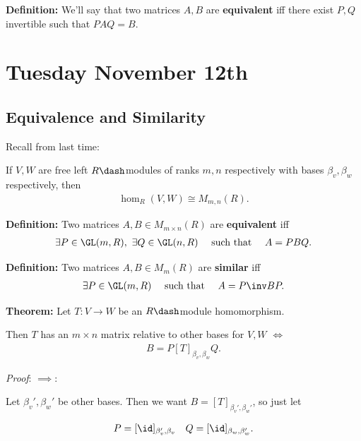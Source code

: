 \textbf{Definition:} We'll say that two matrices \(A, B\) are
\textbf{equivalent} iff there exist \(P, Q\) invertible such that
\(PAQ = B\).

\hypertarget{tuesday-november-12th}{%
\section{Tuesday November 12th}\label{tuesday-november-12th}}

\hypertarget{equivalence-and-similarity}{%
\subsection{Equivalence and
Similarity}\label{equivalence-and-similarity}}

Recall from last time:

If \(V, W\) are free left \(R\dash\)modules of ranks \(m,n\)
respectively with bases \(\beta_v, \beta_w\) respectively, then
\begin{align*}
\hom_R(V, W) \cong M_{m, n}(R)
.\end{align*}

\textbf{Definition:} Two matrices \(A, B \in M_{m \times n}(R)\) are
\textbf{equivalent} iff \begin{align*}
\exists P \in \GL(m, R),~ \exists Q \in \GL(n, R)
\quad \text{ such that } \quad
A = PBQ
.\end{align*}

\textbf{Definition:} Two matrices \(A, B \in M_m(R)\) are
\textbf{similar} iff \begin{align*}
\exists P \in \GL(m, R)
\quad \text{ such that } \quad
A = P\inv B P
.\end{align*}

\textbf{Theorem:} Let \(T: V\to W\) be an \(R\dash\)module homomorphism.

Then \(T\) has an \(m\times n\) matrix relative to other bases for
\(V, W\) \(\iff\)
\begin{align*}
B = P [T]_{\beta_v, \beta_w} Q
.\end{align*}

\emph{Proof}: \(\implies\):

Let \(\beta_v', \beta_w'\) be other bases. Then we want
\(B = [T]_{\beta_v', \beta_w'}\), so just let

\begin{align*}
P = [\id]_{\beta_v', \beta_v} \quad Q = [\id]_{\beta_w, \beta_w'}
.\end{align*}

